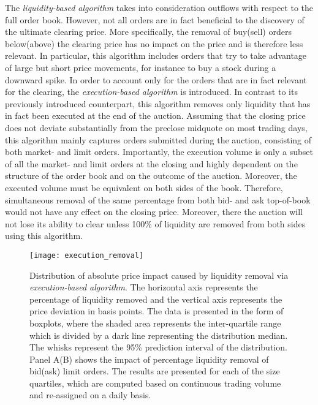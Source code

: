 \documentclass[11pt,a4paper]{article}
\begin{document}
    The \textit{liquidity-based algorithm} takes into consideration outflows with respect to the full order book. However, not all orders are in fact beneficial to the discovery of the ultimate clearing price. More specifically, the removal of buy(sell) orders below(above) the clearing price has no impact on the price and is therefore less relevant. In particular, this algorithm includes orders that try to take advantage of large but short price movements, for instance to buy a stock during a downward spike. In order to account only for the orders that are in fact relevant for the clearing, the \textit{execution-based algorithm} is introduced. In contrast to its previously introduced counterpart, this algorithm removes only liquidity that has in fact been executed at the end of the auction. Assuming that the closing price does not deviate substantially from the preclose midquote on most trading days, this algorithm mainly captures orders submitted during the auction, consisting of both market- and limit orders. Importantly, the execution volume is only a subset of all the market- and limit orders at the closing and highly dependent on the structure of the order book and on the outcome of the auction. Moreover, the executed volume must be equivalent on both sides of the book. Therefore, simultaneous removal of the same percentage from both bid- and ask top-of-book would not have any effect on the closing price. Moreover, there the auction will not lose its ability to clear unless 100\% of liquidity are removed from both sides using this algorithm.

    \begin{figure}[!t]
        \centering
        \texttt{[image: execution\_removal]}
        \caption{Distribution of absolute price impact caused by liquidity removal via \textit{execution-based algorithm}. The horizontal axis represents the percentage of liquidity removed and the vertical axis represents the price deviation in basis points. The data is presented in the form of boxplots, where the shaded area represents the inter-quartile range which is divided by a dark line representing the distribution median. The whisks represent the 95\% prediction interval of the distribution. Panel A(B) shows the impact of percentage liquidity removal of bid(ask) limit orders. The results are presented for each of the size quartiles, which are computed based on continuous trading volume and re-assigned on a daily basis.}
        \label{fig:ExecutionBasedAlgorithm}
    \end{figure}
\end{document}
